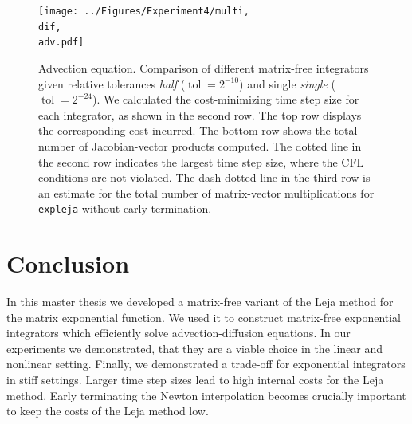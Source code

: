\documentclass{scrartcl}
\begin{document}
\begin{figure}[t]
	\newcommand{\dif}{\detokenize{α}=0}
	\newcommand{\adv}{\detokenize{β}=1}
	\centering
	\texttt{[image: ../Figures/Experiment4/multi, \\dif, \\adv.pdf]}
	\caption{Advection equation. Comparison of different matrix-free integrators given relative tolerances \textit{half} ($\operatorname{tol} = 2^{-10}$) and single \textit{single} ($\operatorname{tol} = 2^{-24}$). We calculated the cost-minimizing time step size for each integrator, as shown in the second row. The top row displays the corresponding cost incurred. The bottom row shows the total number of Jacobian-vector products computed. The dotted line  in the second row indicates the largest time step size, where the CFL conditions are not violated. The dash-dotted line in the third row is an estimate for the total number of matrix-vector multiplications for \texttt{expleja} without early termination.}
	\label{fig:advection}
\end{figure}


\section{Conclusion}
	
	In this master thesis we developed a matrix-free variant of the Leja method for the matrix exponential function. We used it to construct matrix-free exponential integrators which efficiently solve advection-diffusion equations. In our experiments we demonstrated, that they are a viable choice in the linear and nonlinear setting.
	Finally, we demonstrated a trade-off for exponential integrators in stiff settings. Larger time step sizes lead to high internal costs for the Leja method. Early terminating the Newton interpolation becomes crucially important to keep the costs of the Leja method low.
\clearpage
\end{document}
